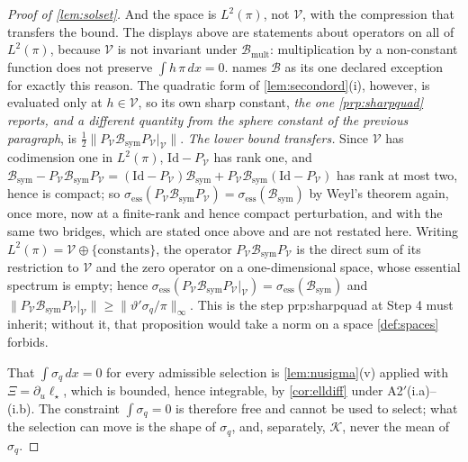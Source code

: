 \begin{proof}[Proof of \cref{lem:solset}]
And the space is $L^{2}(\pi)$, not $\mathcal V$, with the compression that transfers the
bound. The displays above are statements about operators on all of $L^{2}(\pi)$, because $\mathcal V$ is
not invariant under $\mathcal B_{\mathrm{mult}}$: multiplication by a non-constant function does not
preserve
$\int h\,\pi\,dx=0$.  names $\mathcal B$ as its one declared exception for exactly this
reason. The quadratic form of \cref{lem:secondord}(i), however, is evaluated only at $h\in\mathcal V$, so
its own sharp constant, \emph{the one \cref{prp:sharpquad} reports, and a different quantity from the
sphere constant of the previous paragraph}, is
$\tfrac12\|P_{\mathcal V}\mathcal B_{\mathrm{sym}}P_{\mathcal V}|_{\mathcal V}\|$.
\emph{The lower bound transfers.} Since $\mathcal V$ has codimension one in $L^{2}(\pi)$, $\mathrm{Id}-P_{\mathcal V}$
has rank one, and
$\mathcal B_{\mathrm{sym}}-P_{\mathcal V}\mathcal B_{\mathrm{sym}}P_{\mathcal V}
=(\mathrm{Id}-P_{\mathcal V})\mathcal B_{\mathrm{sym}}+P_{\mathcal V}\mathcal B_{\mathrm{sym}}(\mathrm{Id}-P_{\mathcal V})$
has rank at most two, hence is compact; so
$\sigma_{\mathrm{ess}}(P_{\mathcal V}\mathcal B_{\mathrm{sym}}P_{\mathcal V})=\sigma_{\mathrm{ess}}(\mathcal B_{\mathrm{sym}})$
by Weyl's theorem again, \citet[Thm.~IV.5.35]{kato1995} once more, now at a finite-rank and hence
compact perturbation, and with the same two bridges, which are stated once above and are not restated
here. Writing $L^{2}(\pi)=\mathcal V\oplus\{\text{constants}\}$, the operator
$P_{\mathcal V}\mathcal B_{\mathrm{sym}}P_{\mathcal V}$ is the direct sum of its restriction to
$\mathcal V$ and the zero operator on a one-dimensional space, whose essential spectrum is empty; hence
$\sigma_{\mathrm{ess}}(P_{\mathcal V}\mathcal B_{\mathrm{sym}}P_{\mathcal V}|_{\mathcal V})
=\sigma_{\mathrm{ess}}(\mathcal B_{\mathrm{sym}})$ and
$\|P_{\mathcal V}\mathcal B_{\mathrm{sym}}P_{\mathcal V}|_{\mathcal V}\|\ge\|\vartheta'\sigma_q/\pi\|_\infty$.
This is the step \textup{prp:sharpquad} at Step 4 must inherit; without it, that proposition would
take a norm on a space \cref{def:spaces} forbids.

That $\int\sigma_q\,dx=0$ for every admissible selection is \cref{lem:nusigma}(v) applied with
$\Xi=\partial_u\ell_\star$, which is bounded, hence integrable, by \cref{cor:elldiff} under
A2$'$(i.a)--(i.b). The constraint $\int\sigma_q=0$ is therefore free and cannot be used to select;
what the selection can move is the shape of $\sigma_q$, and, separately, $\mathcal K$, never the
mean of $\sigma_q$.
\end{proof}

